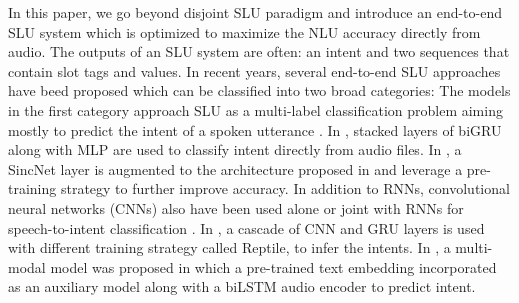 \documentclass[a4paper]{article}
\begin{document}
In this paper, we go beyond disjoint SLU paradigm  and introduce an end-to-end SLU system which is optimized to maximize the NLU accuracy directly from audio.  
The outputs of  an SLU system are often: an intent and two sequences that contain slot tags and values. In recent years, several end-to-end SLU approaches have beed proposed \cite{lugosch2019speech,renkens2018capsule,chen2018spoken,tomashenko2019recent,vu2016bi,liu2017topic,chen2019transfer,haghani2018audio,huang2019adapting,tomashenko2020dialogue,dinarelli2020data,wang2020large,lai2020semisupervised,1910.11559,rao2020speech,martinInterspeech2020,morais2020end,qian2017exploring,chung2021splat}  which can be classified into two broad categories: The models in the first category approach  SLU  as a multi-label classification problem aiming mostly to predict the  intent of a spoken utterance \cite{lugosch2019speech,vu2016bi,serdyuk2018towards,liu2017topic,tian2020improving}.  In \cite{serdyuk2018towards}, stacked layers of biGRU  along with  MLP are used to classify intent directly from audio files. In \cite{lugosch2019speech},  a SincNet layer \cite{Ravanelli2018}  is augmented to the architecture proposed in \cite{serdyuk2018towards} and leverage a pre-training strategy to further improve accuracy. 
 In addition to RNNs, convolutional neural networks (CNNs) also have been used alone or joint with RNNs for speech-to-intent classification \cite{liu2017topic,tian2020improving}.
In \cite{tian2020improving},    a cascade of CNN and GRU layers is used with different training strategy called Reptile, to infer the intents.  
  In \cite{9053281}, a multi-modal model was proposed in which a pre-trained text embedding incorporated as an auxiliary model along with  a biLSTM audio encoder to predict intent. 
 
\end{document}
